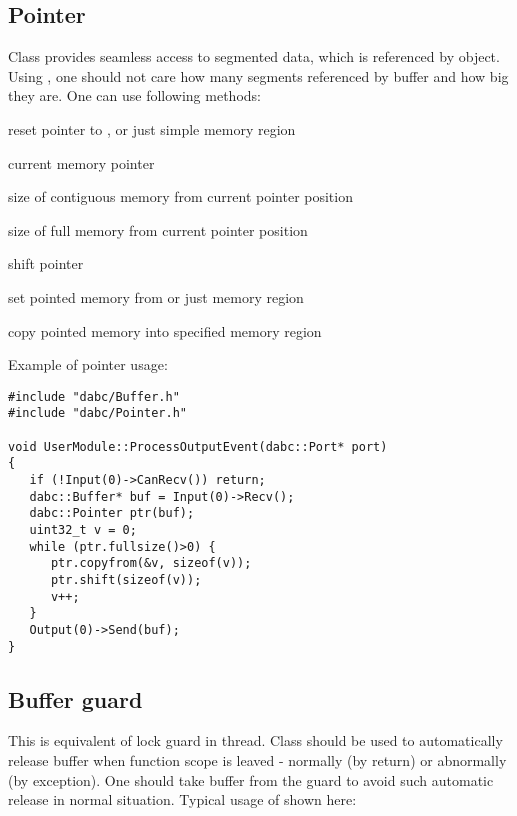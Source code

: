 \subsection{Pointer}
\label{prog_services_memory_pointer}
Class  provides seamless access to 
segmented data, which is referenced by  object.
Using , one should not care how many segments 
referenced by buffer and how big they are. One can use following methods:
\bbul
\item[\func{Pointer()} or \func{reset()}]  reset pointer to ,  or just simple memory region   
\item[\func{ptr()} or \func{operator()}]   current memory pointer
\item[\func{rawsize()}]   size of contiguous memory from current pointer position  
\item[\func{fullsize()}]  size of full memory from current pointer position
\item[\func{shift()}]  shift pointer    
\item[\func{copyfrom()}]  set pointed memory from  or just memory region
\item[\func{copyto()}]  copy pointed memory into specified memory region
\ebul   

Example of pointer usage:

\begin{small}
\begin{verbatim}     
#include "dabc/Buffer.h"
#include "dabc/Pointer.h"

void UserModule::ProcessOutputEvent(dabc::Port* port)
{
   if (!Input(0)->CanRecv()) return;
   dabc::Buffer* buf = Input(0)->Recv();
   dabc::Pointer ptr(buf);
   uint32_t v = 0; 
   while (ptr.fullsize()>0) {
      ptr.copyfrom(&v, sizeof(v));
      ptr.shift(sizeof(v));
      v++;
   }
   Output(0)->Send(buf);
}
\end{verbatim}     
\end{small}



\subsection{Buffer guard}

This is equivalent of lock guard in thread.
Class  should be used to automatically release 
buffer when function scope is leaved - normally (by return) or abnormally 
(by exception). One should  take buffer from the guard
to avoid such automatic release in normal situation. Typical usage 
of  shown here:

